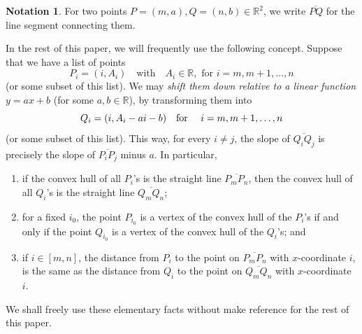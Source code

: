 \documentclass[12pt]{amsart}
\theoremstyle{definition}
\newtheorem{notation}[subsection]{Notation}
\numberwithin{equation}{subsection}
\def\RR{\mathbb{R}}
\begin{document}
\begin{notation}
\label{N:linear shift down}
For two points $P = (m, a), Q = (n,b) \in \RR^2$, we write $\overline{PQ}$ for the line segment connecting them.

In the rest of this paper, we will frequently use the following concept. Suppose that we have a list of points $$P_i = (i,A_i) \quad\textrm{with} \quad A_i \in \RR, \textrm{ for } i = m,m+1, \dots, n$$ (or some subset of this list). We may \emph{shift them down relative to a linear function} $y = ax+b$ (for some $a,b \in \RR$), by transforming them into $$Q_i  = (i, A_i - ai-b) \textrm{\quad for \quad}i = m,m+1, \dots, n$$ (or some subset of this list).
This way, for every $i\neq j$, the slope of $\overline {Q_iQ_j}$ is precisely the slope of $\overline{P_iP_j}$ minus $a$. In particular, 
\begin{enumerate}
\item 
if the convex hull of all $P_i$'s is the straight line $\overline{P_mP_n}$, then the convex hull of all $Q_i$'s is the straight line $\overline{Q_mQ_n}$;
\item for a fixed $i_0$, the point $P_{i_0}$ is a vertex of the convex hull of the $P_i$'s if and only if the point $Q_{i_0}$ is a vertex of the convex hull of the $Q_i$'s; and
\item if $i \in [m,n]$, the distance from $P_i$ to the point on $\overline{P_mP_n}$ with $x$-coordinate $i$, is the same as the distance from $Q_i$ to the point on $\overline{Q_mQ_n}$ with $x$-coordinate $i$.
\end{enumerate}
We shall freely use these elementary facts without make reference for the rest of this paper.
\end{notation}
\end{document}
